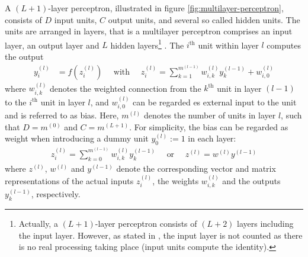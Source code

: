 A $(L+1)$-layer perceptron, illustrated in figure \ref{fig:multilayer-perceptron}, consists of $D$ input units, $C$ output units, and several so called hidden units. The units are arranged in layers, that is a multilayer perceptron comprises an input layer, an output layer and $L$ hidden layers\footnote{Actually, a $(L+1)$-layer perceptron consists of $(L+2)$ layers including the input layer. However, as stated in \cite{Bishop:2006}, the input layer is not counted as there is no real processing taking place (input units compute the identity).} \cite[p.~117-120]{Bishop:1995}. The $i^{\text{th}}$ unit within layer $l$ computes the output
\begin{align}
	y_i^{(l)} &= f\left(z_i^{(l)}\right) \quad\text{ with }\quad z_i^{(l)} = \sum _{k = 1} ^{m^{(l-1)}} w_{i,k}^{(l)} y_k^{(l-1)} + w_{i,0}^{(l)}
\end{align}
where $w_{i,k}^{(l)}$ denotes the weighted connection from the $k^{\text{th}}$ unit in layer $(l-1)$ to the $i^{\text{th}}$ unit in layer $l$, and $w_{i,0}^{(l)}$ can be regarded es external input to the unit and is referred to as bias. Here, $m^{(l)}$ denotes the number of units in layer $l$, such that $D = m^{(0)}$ and $C = m^{(L+1)}$. For simplicity, the bias can be regarded as weight when introducing a dummy unit $y_0^{(l)} := 1$ in each layer:
\begin{align}
	\label{eq:multilayer-perceptron}
	z_i^{(l)} = \sum _{k = 0} ^{m^{(l-1)}} w_{i,k}^{(l)} y_k^{(l-1)}\quad \text{ or }\quad z^{(l)} = w^{(l)} y^{(l-1)}
\end{align}
where $z^{(l)}$, $w^{(l)}$ and $y^{(l-1)}$ denote the corresponding vector and matrix representations of the actual inputs $z_i^{(l)}$, the weights $w_{i,k}^{(l)}$ and the outputs $y_k^{(l-1)}$, respectively.
